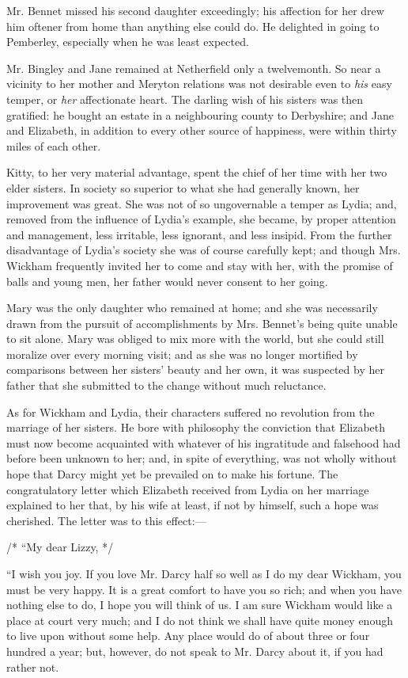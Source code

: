 \documentclass[12pt]{book}
\begin{document}
Mr. Bennet missed his second daughter exceedingly; his affection for her drew him oftener from home than anything else could do. He delighted in going to Pemberley, especially when he was least expected.

Mr. Bingley and Jane remained at Netherfield only a twelvemonth. So near a vicinity to her mother and Meryton relations was not desirable even to \textit{his} easy temper, or \textit{her} affectionate heart. The darling wish of his sisters was then gratified: he bought an estate in a neighbouring county to Derbyshire; and Jane and Elizabeth, in addition to every other source of happiness, were within thirty miles of each other.

Kitty, to her very material advantage, spent the chief of her time with her two elder sisters. In society so superior to what she had generally known, her improvement was great. She was not of so ungovernable a temper as Lydia; and, removed from the influence of Lydia's example, she became, by proper attention and management, less irritable, less ignorant, and less insipid. From the further disadvantage of Lydia's society she was of course carefully kept; and though Mrs. Wickham frequently invited her to come and stay with her, with the promise of balls and young men, her father would never consent to her going.

Mary was the only daughter who remained at home; and she was necessarily drawn from the pursuit of accomplishments by Mrs. Bennet's being quite unable to sit alone. Mary was obliged to mix more with the world, but she could still moralize over every morning visit; and as she was no longer mortified by comparisons between her sisters' beauty and her own, it was suspected by her father that she submitted to the change without much reluctance.

As for Wickham and Lydia, their characters suffered no revolution from the marriage of her sisters. He bore with philosophy the conviction that Elizabeth must now become acquainted with whatever of his ingratitude and falsehood had before been unknown to her; and, in spite of everything, was not wholly without hope that Darcy might yet be prevailed on to make his fortune. The congratulatory letter which Elizabeth received from Lydia on her marriage explained to her that, by his wife at least, if not by himself, such a hope was cherished. The letter was to this effect:---

/* ``My dear Lizzy, */

``I wish you joy. If you love Mr. Darcy half so well as I do my dear Wickham, you must be very happy. It is a great comfort to have you so rich; and when you have nothing else to do, I hope you will think of us. I am sure Wickham would like a place at court very much; and I do not think we shall have quite money enough to live upon without some help. Any place would do of about three or four hundred a year; but, however, do not speak to Mr. Darcy about it, if you had rather not.
\end{document}
